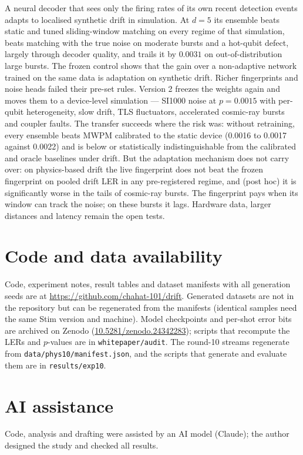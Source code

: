 \documentclass[11pt,a4paper]{article}
\newcommand{\code}[1]{\texttt{#1}}
\begin{document}
A neural decoder that sees only the firing rates of its own recent detection events adapts to localised
synthetic drift in simulation. At $d=5$ its ensemble beats static and tuned sliding-window matching on every
regime of that simulation, beats
matching with the true noise on moderate bursts and a hot-qubit defect, largely through decoder quality, and trails it by $0.0031$ on out-of-distribution large
bursts. The frozen control shows that the gain over a non-adaptive network trained on the same data is adaptation
on synthetic drift. Richer fingerprints and noise heads failed their pre-set
rules. Version 2 freezes the weights again and moves them to a device-level simulation --- SI1000 noise at
$p=0.0015$ with per-qubit heterogeneity, slow drift, TLS fluctuators, accelerated cosmic-ray bursts and
coupler faults. The transfer succeeds where the risk was: without retraining, every ensemble beats MWPM
calibrated to the static device (0.0016 to 0.0017 against 0.0022) and is below or statistically
indistinguishable from the calibrated and
oracle baselines under drift. But the adaptation mechanism does not carry over: on physics-based drift the
live fingerprint does not beat the frozen fingerprint on pooled drift LER in any pre-registered regime,
and (post hoc) it is significantly worse in the tails of cosmic-ray bursts. The fingerprint pays when its window can track the noise; on these bursts it lags. Hardware data,
larger distances and latency remain the open tests.

\section*{Code and data availability}
Code, experiment notes, result tables and dataset manifests with all generation seeds are at
\url{https://github.com/chahat-101/drift}. Generated datasets are not in the repository but can be
regenerated from the manifests (identical samples need the same Stim version and machine). Model checkpoints and
per-shot error bits are archived on Zenodo (\href{https://doi.org/10.5281/zenodo.24342283}{10.5281/zenodo.24342283}); scripts that recompute the LERs and $p$-values are
in \code{whitepaper/audit}. The round-10 streams regenerate from \code{data/phys10/manifest.json}, and the
scripts that generate and evaluate them are in \code{results/exp10}.

\section*{AI assistance}
Code, analysis and drafting were assisted by an AI model (Claude); the author designed the study and checked all
results.
\end{document}
